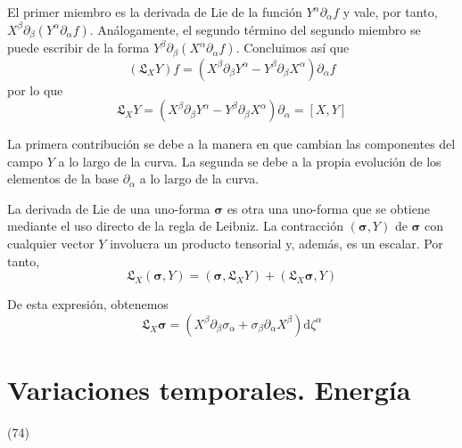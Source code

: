 El primer miembro es la derivada de Lie de la función $Y^{\alpha} \partial_{\alpha} f$ y vale, por tanto, $X^{\beta} \partial_{\beta}\left(Y^{\alpha} \partial_{\alpha} f\right)$. Análogamente, el segundo término del segundo miembro se puede escribir de la forma $Y^{\beta} \partial_{\beta}\left(X^{\alpha} \partial_{\alpha} f\right)$. Concluimos así que
$$
\left(\mathfrak{L}_{X} Y\right) f=\left(X^{\beta} \partial_{\beta} Y^{\alpha}-Y^{\beta} \partial_{\beta} X^{\alpha}\right) \partial_{\alpha} f
$$
por lo que
$$
\mathfrak{L}_{X} Y=\left(X^{\beta} \partial_{\beta} Y^{\alpha}-Y^{\beta} \partial_{\beta} X^{\alpha}\right) \partial_{\alpha}=[X, Y]
$$

La primera contribución se debe a la manera en que cambian las componentes del campo $Y$ a lo largo de la curva. La segunda se debe a la propia evolución de los elementos de la base $\partial_{\alpha}$ a lo largo de la curva.

La derivada de Lie de una uno-forma $\boldsymbol{\sigma}$ es otra una uno-forma que se obtiene mediante el uso directo de la regla de Leibniz. La contracción $(\boldsymbol{\sigma}, Y)$ de $\boldsymbol{\sigma}$ con cualquier vector $Y$ involucra un producto tensorial y, además, es un escalar. Por tanto,
$$
\mathfrak{L}_{X}(\boldsymbol{\sigma}, Y)=\left(\boldsymbol{\sigma}, \mathfrak{L}_{X} Y\right)+\left(\mathfrak{L}_{X} \boldsymbol{\sigma}, Y\right)
$$

De esta expresión, obtenemos
$$
\mathfrak{L}_{X} \boldsymbol{\sigma}=\left(X^{\beta} \partial_{\beta} \sigma_{\alpha}+\sigma_{\beta} \partial_{\alpha} X^{\beta}\right) \mathrm{d} \zeta^{\alpha}
$$
\section{Variaciones temporales. Energía} (74)


